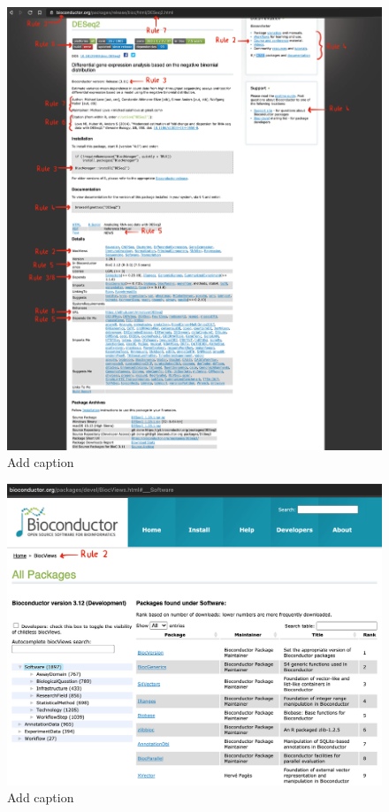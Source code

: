 \documentclass[10pt,letterpaper]{article}
\begin{document}
\begin{figure}
\includegraphics[width=1\linewidth]{../figures/bioc_deseq2} \caption{Add caption}\label{fig:bioc_deseq2}
\end{figure}

\begin{figure}
\includegraphics[width=1\linewidth]{../figures/biocViews} \caption{Add caption}\label{fig:biocViews}
\end{figure}
\end{document}
